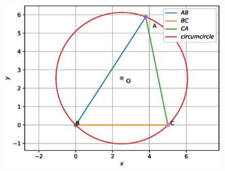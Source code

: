 \begin{enumerate}[label=\arabic*.,ref=\thesubsection.\theenumi]
\begin{figure}[!ht]
\includegraphics[width=\columnwidth]{./circle/figs/circle_const_ccircle.eps}
\caption{}
\label{fig:circle_const_ccircle}
\end{figure}


\end{enumerate}
